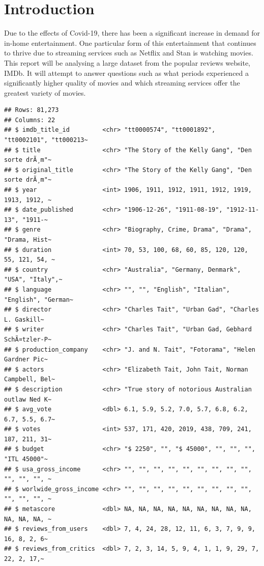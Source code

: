 \documentclass[11pt,a4paper,]{article}
\begin{document}
\hypertarget{introduction}{%
\section{Introduction}\label{introduction}}

Due to the effects of Covid-19, there has been a significant increase in demand for in-home entertainment. One particular form of this entertainment that continues to thrive due to streaming services such as Netflix and Stan is watching movies. This report will be analysing a large dataset from the popular reviews website, IMDb. It will attempt to answer questions such as what periods experienced a significantly higher quality of movies and which streaming services offer the greatest variety of movies.

\begin{verbatim}
## Rows: 81,273
## Columns: 22
## $ imdb_title_id         <chr> "tt0000574", "tt0001892", "tt0002101", "tt000213~
## $ title                 <chr> "The Story of the Kelly Gang", "Den sorte drÃ¸m"~
## $ original_title        <chr> "The Story of the Kelly Gang", "Den sorte drÃ¸m"~
## $ year                  <int> 1906, 1911, 1912, 1911, 1912, 1919, 1913, 1912, ~
## $ date_published        <chr> "1906-12-26", "1911-08-19", "1912-11-13", "1911-~
## $ genre                 <chr> "Biography, Crime, Drama", "Drama", "Drama, Hist~
## $ duration              <int> 70, 53, 100, 68, 60, 85, 120, 120, 55, 121, 54, ~
## $ country               <chr> "Australia", "Germany, Denmark", "USA", "Italy",~
## $ language              <chr> "", "", "English", "Italian", "English", "German~
## $ director              <chr> "Charles Tait", "Urban Gad", "Charles L. Gaskill~
## $ writer                <chr> "Charles Tait", "Urban Gad, Gebhard SchÃ¤tzler-P~
## $ production_company    <chr> "J. and N. Tait", "Fotorama", "Helen Gardner Pic~
## $ actors                <chr> "Elizabeth Tait, John Tait, Norman Campbell, Bel~
## $ description           <chr> "True story of notorious Australian outlaw Ned K~
## $ avg_vote              <dbl> 6.1, 5.9, 5.2, 7.0, 5.7, 6.8, 6.2, 6.7, 5.5, 6.7~
## $ votes                 <int> 537, 171, 420, 2019, 438, 709, 241, 187, 211, 31~
## $ budget                <chr> "$ 2250", "", "$ 45000", "", "", "", "ITL 45000"~
## $ usa_gross_income      <chr> "", "", "", "", "", "", "", "", "", "", "", "", ~
## $ worlwide_gross_income <chr> "", "", "", "", "", "", "", "", "", "", "", "", ~
## $ metascore             <dbl> NA, NA, NA, NA, NA, NA, NA, NA, NA, NA, NA, NA, ~
## $ reviews_from_users    <dbl> 7, 4, 24, 28, 12, 11, 6, 3, 7, 9, 9, 16, 8, 2, 6~
## $ reviews_from_critics  <dbl> 7, 2, 3, 14, 5, 9, 4, 1, 1, 9, 29, 7, 22, 2, 17,~
\end{verbatim}
\end{document}
